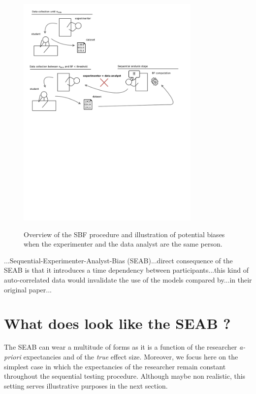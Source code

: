 \documentclass[a4paper,man,natbib,floatsintext,donotrepeattitle]{apa6}
\begin{document}
\begin{figure}[H]
  \caption{Overview of the SBF procedure and illustration of potential biases when the experimenter and the data analyst are the same person.}
  \centering
  \includegraphics[width=0.8\textwidth]{figures/bias_diag.pdf}
  \label{fig:diag1}
\end{figure}

...Sequential-Experimenter-Analyst-Bias (SEAB)...direct consequence of the SEAB is that it introduces a time dependency between participants...this kind of auto-correlated data would invalidate the use of the models compared by...in their original paper...

\section{What does look like the SEAB ?}

The SEAB can wear a multitude of forms as it is a function of the researcher \textit{a-priori} expectancies and of the \textit{true} effect size. Moreover, we focus here on the simplest case in which the expectancies of the researcher remain constant throughout the sequential testing procedure. Although maybe non realistic, this setting serves illustrative purposes in the next section.
\end{document}
